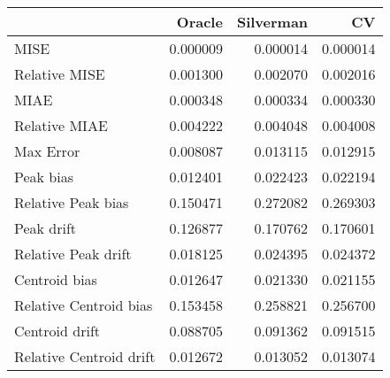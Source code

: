 \begin{tabular}{lrrr}
  \hline
 & Oracle & Silverman & CV \\ 
  \hline
MISE & 0.000009 & 0.000014 & 0.000014 \\ 
  Relative MISE & 0.001300 & 0.002070 & 0.002016 \\ 
  MIAE & 0.000348 & 0.000334 & 0.000330 \\ 
  Relative MIAE & 0.004222 & 0.004048 & 0.004008 \\ 
  Max Error & 0.008087 & 0.013115 & 0.012915 \\ 
  Peak bias & 0.012401 & 0.022423 & 0.022194 \\ 
  Relative Peak bias & 0.150471 & 0.272082 & 0.269303 \\ 
  Peak drift & 0.126877 & 0.170762 & 0.170601 \\ 
  Relative Peak drift & 0.018125 & 0.024395 & 0.024372 \\ 
  Centroid bias & 0.012647 & 0.021330 & 0.021155 \\ 
  Relative Centroid bias & 0.153458 & 0.258821 & 0.256700 \\ 
  Centroid drift & 0.088705 & 0.091362 & 0.091515 \\ 
  Relative Centroid drift & 0.012672 & 0.013052 & 0.013074 \\ 
   \hline
\end{tabular}
